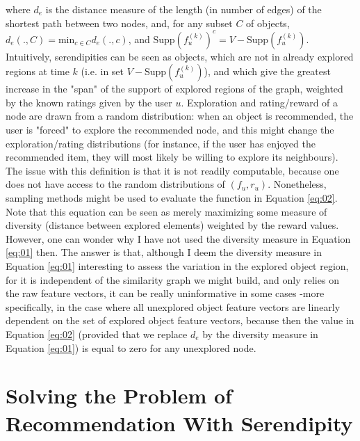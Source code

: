 \documentclass{article}
\begin{document}
where $d_e$ is the distance measure of the length (in number of edges) of the shortest path between two nodes, and, for any subset $C$ of objects, $d_e(., C) = \text{min}_{c \in C} d_e(., c)$, and $\text{Supp}(f^{(k)}_{u})^{c} = V-\text{Supp}(f^{(k)}_{u})$. Intuitively, serendipities can be seen as objects, which are not in already explored regions at time $k$ (i.e. in set $V - \text{Supp}(f^{(k)}_{u})$), and which give the greatest increase in the "span" of the support of explored regions of the graph, weighted by the known ratings given by the user $u$. Exploration and rating/reward of a node are drawn from a random distribution: when an object is recommended, the user is "forced" to explore the recommended node, and this might change the exploration/rating distributions (for instance, if the user has enjoyed the recommended item, they will most likely be willing to explore its neighbours). The issue with this definition is that it is not readily computable, because one does not have access to the random distributions of $(f_{u}, r_{u})$. Nonetheless, sampling methods might be used to evaluate the function in Equation \ref{eq:02}. Note that this equation can be seen as merely maximizing some measure of diversity (distance between explored elements) weighted by the reward values. However, one can wonder why I have not used the diversity measure in Equation \ref{eq:01} then. The answer is that, although I deem the diversity measure in Equation \ref{eq:01} interesting to assess the variation in the explored object region, for it is independent of the similarity graph we might build, and only relies on the raw feature vectors, it can be really uninformative in some cases -more specifically, in the case where all unexplored object feature vectors are linearly dependent on the set of explored object feature vectors, because then the value in Equation \ref{eq:02} (provided that we replace $d_e$ by the diversity measure in Equation \ref{eq:01}) is equal to zero for any unexplored node.

\section{Solving the Problem of Recommendation With Serendipity}
\end{document}
